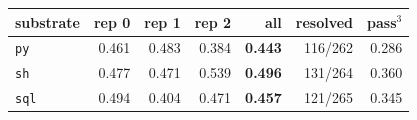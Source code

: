 \begin{tabular}{lrrrrrr}
\toprule
substrate & rep 0 & rep 1 & rep 2 & all & resolved & pass$^3$ \\
\midrule
\texttt{py} & 0.461 & 0.483 & 0.384 & \textbf{0.443} & 116/262 & 0.286 \\
\texttt{sh} & 0.477 & 0.471 & 0.539 & \textbf{0.496} & 131/264 & 0.360 \\
\texttt{sql} & 0.494 & 0.404 & 0.471 & \textbf{0.457} & 121/265 & 0.345 \\
\bottomrule
\end{tabular}
